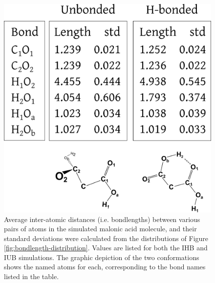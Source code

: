 \begin{figure}[h!]
	\begin{center}
		\includegraphics[scale=1.0]{images/bond-length/bondlength-table.png}
		\caption{Average inter-atomic distances (i.e. bondlengths) between various pairs of atoms in the simulated malonic acid molecule, and their standard deviations were calculated from the distributions of Figure \ref{fig:bondlength-distribution}. Values are listed for both the IHB and IUB simulations. The graphic depiction of the two conformations shows the named atoms for each, corresponding to the bond names listed in the table.}
	\label{table:peaks}
	\end{center}
\end{figure}
